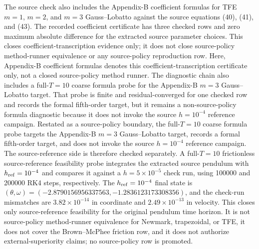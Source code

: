\documentclass[preprint,12pt]{elsarticle}
\newcommand{\tfe}{TFE}
\begin{document}
The source check also includes the Appendix-B coefficient formulas for
\tfe{} $m=1$, $m=2$, and $m=3$ Gauss--Lobatto against the source equations
(40), (41), and (43).  The recorded coefficient certificate has three checked
rows and zero maximum absolute difference for the extracted source parameter
choices.  This closes coefficient-transcription evidence only; it does not
close source-policy method-runner equivalence or any source-policy reproduction
row.
Here, Appendix-B coefficient formulas denotes this coefficient-transcription
certificate only, not a closed source-policy method runner.
The diagnostic chain also includes a full-$T=10$ coarse formula probe for
the Appendix-B $m=3$ Gauss--Lobatto target.  That probe is finite and
residual-converged for one checked row and records the formal fifth-order
target, but it remains a non-source-policy formula diagnostic because it does
not invoke the source $h=10^{-4}$ reference campaign.
Restated as a source-policy boundary, the full-$T=10$ coarse formula probe
targets the Appendix-B $m=3$ Gauss--Lobatto target, records a formal
fifth-order target, and does not invoke the source $h=10^{-4}$ reference
campaign.
The source-reference side is therefore checked separately.  A full-$T=10$
frictionless source-reference feasibility probe integrates the extracted
source pendulum with $h_{\rm ref}=10^{-4}$ and compares it against a
$h=5\times10^{-5}$ check run, using 100000 and 200000 RK4 steps,
respectively.  The $h_{\rm ref}=10^{-4}$ final state is
$(\theta,\omega)=(-2.8790156956337563,-1.2836123173308356)$, and the
check-run mismatches are $3.82\times10^{-14}$ in coordinate and
$2.49\times10^{-13}$ in velocity.  This closes only source-reference
feasibility for the original pendulum time horizon.  It is not
source-policy method-runner equivalence for Newmark, trapezoidal, or
\tfe{}, it does not cover the Brown--McPhee friction row, and it does not
authorize external-superiority claims; no source-policy row is promoted.
\end{document}

